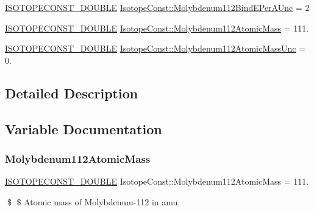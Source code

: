 \begin{DoxyCompactItemize}
\mbox{\hyperlink{group___isotope_const-_macros_ga8f45a7272ce02c0b4c65c44636ed719a}{I\+S\+O\+T\+O\+P\+E\+C\+O\+N\+S\+T\+\_\+\+D\+O\+U\+B\+LE}} \mbox{\hyperlink{group___isotope_const-_molybdenum-_mo112_gad7e0bcb37214ae7344ce176f4bb3b68d}{Isotope\+Const\+::\+Molybdenum112\+Bind\+E\+Per\+A\+Unc}} = 2
\item 
\mbox{\hyperlink{group___isotope_const-_macros_ga8f45a7272ce02c0b4c65c44636ed719a}{I\+S\+O\+T\+O\+P\+E\+C\+O\+N\+S\+T\+\_\+\+D\+O\+U\+B\+LE}} \mbox{\hyperlink{group___isotope_const-_molybdenum-_mo112_ga9990e360c1918628811d57ae25d4a76e}{Isotope\+Const\+::\+Molybdenum112\+Atomic\+Mass}} = 111.
\item 
\mbox{\hyperlink{group___isotope_const-_macros_ga8f45a7272ce02c0b4c65c44636ed719a}{I\+S\+O\+T\+O\+P\+E\+C\+O\+N\+S\+T\+\_\+\+D\+O\+U\+B\+LE}} \mbox{\hyperlink{group___isotope_const-_molybdenum-_mo112_ga83213ecb0b65b7f3f3a0dd8ca35c2dfc}{Isotope\+Const\+::\+Molybdenum112\+Atomic\+Mass\+Unc}} = 0.
\end{DoxyCompactItemize}


\subsection{Detailed Description}


\subsection{Variable Documentation}
\mbox{\label{group___isotope_const-_molybdenum-_mo112_ga9990e360c1918628811d57ae25d4a76e}} 
\subsubsection{\texorpdfstring{Molybdenum112\+Atomic\+Mass}{Molybdenum112AtomicMass}}
{\footnotesize\ttfamily \mbox{\hyperlink{group___isotope_const-_macros_ga8f45a7272ce02c0b4c65c44636ed719a}{I\+S\+O\+T\+O\+P\+E\+C\+O\+N\+S\+T\+\_\+\+D\+O\+U\+B\+LE}} Isotope\+Const\+::\+Molybdenum112\+Atomic\+Mass = 111.}

\$ \$ Atomic mass of Molybdenum-\/112 in amu. \mbox{\label{group___isotope_const-_molybdenum-_mo112_ga83213ecb0b65b7f3f3a0dd8ca35c2dfc}} 
